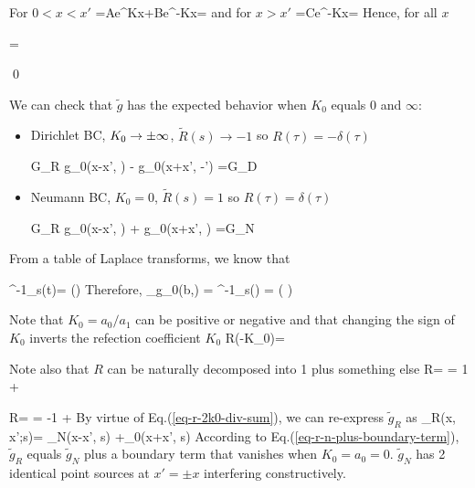 For $0<x<x'$
\beq
{}=Ae^{Kx}+Be^{-Kx}=
\left[
e^{K(x-x')} +R e^{-K(x+x')}
\right]
\eeq
and for $x>x'$
\beq
{}=Ce^{-Kx}=
\left[ 
e^{-K(x-x')}+Re^{-K(x+x')}\right]
\eeq
Hence, for all $x$

\beq
{}=
\left[ 
e^{-K|x-x'|}+R e^{-K(x+x')}\right]
\eeq



\qed

We can check
that $\tilde{g}$
has the expected
behavior when
$K_0$ equals $0$ and $\infty$: 
\begin{itemize}
\item Dirichlet BC, $K_0\rightarrow \pm\infty$, $\tilde{R}(s)\to -1$ so $R(\tau)=-\delta(\tau)$

\beq G_R\rarrow 
g_0(x-x', \tau)
-
g_0(x+x', \tau -\tau')
=G_D
\eeq
\item
Neumann BC, $K_0=0$,
$\tilde{R}(s)=1$ so 
$R(\tau)=\delta(\tau)$

\beq G_R\rarrow 
g_0(x-x', \tau)
+
g_0(x+x', \tau )
=G_N
\eeq
\end{itemize}


From 
a table of Laplace
transforms, we know that

\beq
\call^{-1}_s(t)=
\exp\left(\right)
\eeq
Therefore, 
\beq
{}_{g_0(b,\tau)}
=
\call^{-1}_s\left[
\left.
\frac{1}{2DK}e^{-bK}
\right|_{K=\sqrt{s/D}}
\right](\tau)
=
\exp\left(
\right)
\eeq

Note that $K_0=a_0/a_1$ can be positive or negative
and that changing the
sign of $K_0$
inverts the refection
coefficient $K_0$
\beq
R(-K_0)=
\eeq

Note also that $R$
can be naturally decomposed into 1 plus something else
\beq
R= =
1 +
\label{eq-r-2k0-div-sum}
\eeq

\beq
R= =
-1 +
\eeq
By virtue of Eq.(\ref{eq-r-2k0-div-sum}), we can re-express $\tilde{g}_R$ as
\beq
{}_R(x, x';s)=
_N(x-x', s)
+_0(x+x', s)
\label{eq-r-n-plus-boundary-term}
\eeq
According to
Eq.(\ref{eq-r-n-plus-boundary-term}), $\tilde{g}_R$
equals $\tilde{g}_N$  plus a boundary term that vanishes when $K_0=a_0=0$.
$\tilde{g}_N$  has 2 identical point sources
at $x'=\pm x$ interfering constructively.



